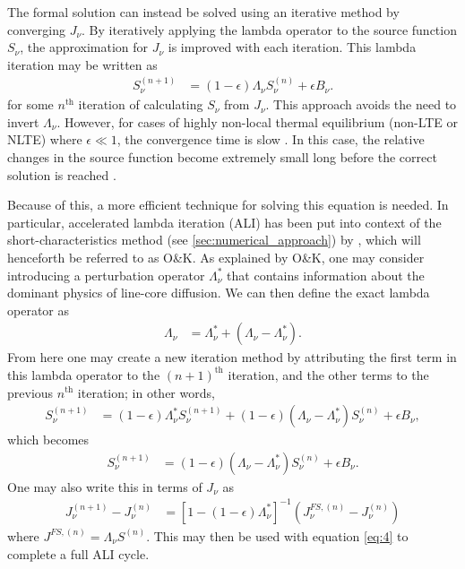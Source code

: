 \documentclass[12pt]{article}
\begin{document}
The formal solution can instead be solved using an iterative method by converging $J_\nu$. By iteratively applying the lambda operator to the source function $S_\nu$, the approximation for $J_\nu$ is improved with each iteration. This lambda iteration may be written as
\begin{align}
S^{(n + 1)}_\nu
&=
(1 - \epsilon) \Lambda_\nu S^{(n)}_\nu + \epsilon B_\nu.
\end{align}
for some $n^\text{th}$ iteration of calculating $S_\nu$ from $J_\nu$. This approach avoids the need to invert $\Lambda_\nu$. However, for cases of highly non-local thermal equilibrium (non-LTE or NLTE) where $\epsilon \ll 1$, the convergence time is slow \citep[see, e.g.,][]{mihalas1978}. In this case, the relative changes in the source function become extremely small long before the correct solution is reached \citep[see][]{hubeny2003}.

Because of this, a more efficient technique for solving this equation is needed. In particular, accelerated lambda iteration (ALI) has been put into context of the short-characteristics method (see \autoref{sec:numerical_approach}) by \cite{OandK1987}, which will henceforth be referred to as O\&K. As explained by O\&K, one may consider introducing a perturbation operator $\Lambda^*_\nu$ that contains information about the dominant physics of line-core diffusion. We can then define the exact lambda operator as
\begin{align}
\Lambda_\nu
&=
\Lambda^*_\nu + (\Lambda_\nu - \Lambda^*_\nu).
\end{align}
From here one may create a new iteration method by attributing the first term in this lambda operator to the $(n + 1)^\text{th}$ iteration, and the other terms to the previous $n^\text{th}$ iteration; in other words,
\begin{align}
S^{(n + 1)}_\nu
&=
(1 - \epsilon) \Lambda^*_\nu S^{(n + 1)}_\nu + (1 - \epsilon) (\Lambda_\nu - \Lambda^*_\nu) S^{(n)}_\nu + \epsilon B_\nu,
\end{align}
which becomes
\begin{align}
[1 - (1 - \epsilon) \Lambda^*_\nu] S^{(n + 1)}_\nu
&=
(1 - \epsilon) (\Lambda_\nu - \Lambda^*_\nu) S^{(n)}_\nu + \epsilon B_\nu.
\end{align}
One may also write this in terms of $J_\nu$ as
\begin{align}
J_\nu^{(n + 1)} - J_\nu^{(n)}
&=
[1 - (1 - \epsilon) \Lambda^*_\nu]^{-1} (J_\nu^{FS, (n)} - J_\nu^{(n)})
\label{eq:11}
\end{align}
where $J^{FS, (n)} = \Lambda_\nu S^{(n)}$. This may then be used with equation \ref{eq:4} to complete a full ALI cycle.
\end{document}
